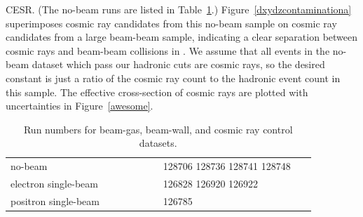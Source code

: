 \documentclass{cornell}
\begin{document}
CESR.  (The no-beam runs are listed in Table~\ref{tab:controls}.)
Figure~\ref{dxydzcontaminationa} superimposes cosmic ray candidates
from this no-beam sample on cosmic ray candidates from a large
beam-beam sample, indicating a clear separation between cosmic rays
and beam-beam collisions in \dxy.
We assume that all events in the no-beam dataset which pass our
hadronic cuts are cosmic rays, so the desired constant is just a ratio
of the cosmic ray count to the hadronic event count in this sample.
The effective cross-section of cosmic rays are plotted with
uncertainties in Figure~\ref{awesome}.

\begin{table}
  \caption{\label{tab:controls} Run numbers for beam-gas, beam-wall,
    and cosmic ray control datasets.}
  \begin{center}
    \begin{tabular}{p{0.45\linewidth} p{0.45\linewidth}}
      \hline\hline
      no-beam & 128706 128736 128741 128748 \\
      electron single-beam & 126828 126920 126922 \\
      positron single-beam & 126785 \\ \hline\hline
    \end{tabular}
  \end{center}
\end{table}
\end{document}
